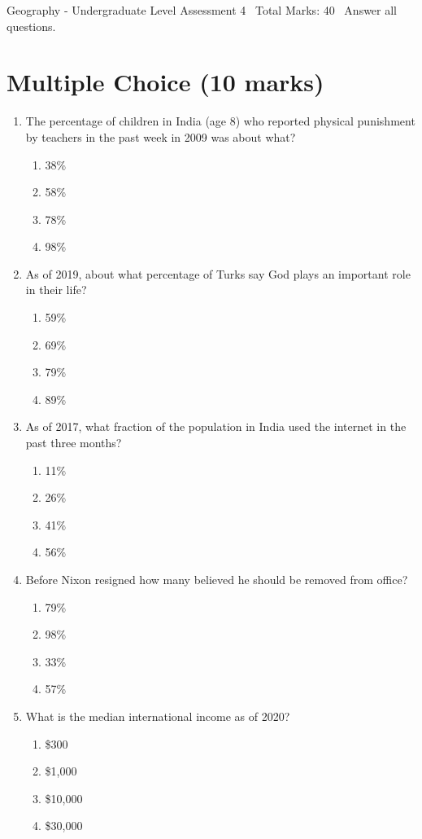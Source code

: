 \documentclass[12pt]{article}
\begin{document}
\begin{center}
Geography - Undergraduate Level Assessment 4 \
Total Marks: 40 \
Answer all questions.
\end{center}

\section*{Multiple Choice (10 marks)}
\begin{enumerate}[label=\arabic*.]
\item The percentage of children in India (age 8) who reported physical punishment by teachers in the past week in 2009 was about what?
\begin{enumerate}[label=(\alph*)]
    \item 38\%
    \item 58\%
    \item 78\%
    \item 98\%
\end{enumerate}
\item As of 2019, about what percentage of Turks say God plays an important role in their life?
\begin{enumerate}[label=(\alph*)]
    \item 59\%
    \item 69\%
    \item 79\%
    \item 89\%
\end{enumerate}
\item As of 2017, what fraction of the population in India used the internet in the past three months?
\begin{enumerate}[label=(\alph*)]
    \item 11\%
    \item 26\%
    \item 41\%
    \item 56\%
\end{enumerate}
\item Before Nixon resigned how many believed he should be removed from office?
\begin{enumerate}[label=(\alph*)]
    \item 79\%
    \item 98\%
    \item 33\%
    \item 57\%
\end{enumerate}
\item What is the median international income as of 2020?
\begin{enumerate}[label=(\alph*)]
    \item \$300
    \item \$1,000
    \item \$10,000
    \item \$30,000
\end{enumerate}
\end{enumerate}
\end{document}
